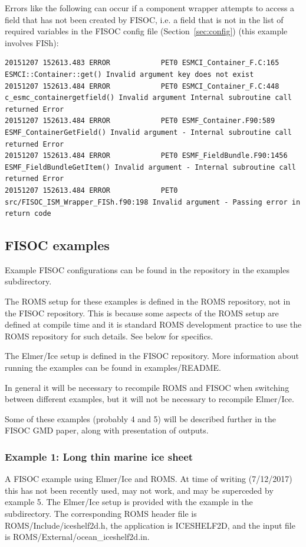 \documentclass[12pt]{article}
\begin{document}
Errors like the following can occur if a component wrapper attempts to access a field 
that has not been created by FISOC, i.e. a field that is not in the list of
required variables in the FISOC config file (Section~\ref{sec:config}) 
(this example involves FISh):
\begin{lstlisting}
20151207 152613.483 ERROR            PET0 ESMCI_Container_F.C:165 ESMCI::Container::get() Invalid argument key does not exist
20151207 152613.484 ERROR            PET0 ESMCI_Container_F.C:448 c_esmc_containergetfield() Invalid argument Internal subroutine call returned Error
20151207 152613.484 ERROR            PET0 ESMF_Container.F90:589 ESMF_ContainerGetField() Invalid argument - Internal subroutine call returned Error
20151207 152613.484 ERROR            PET0 ESMF_FieldBundle.F90:1456 ESMF_FieldBundleGetItem() Invalid argument - Internal subroutine call returned Error
20151207 152613.484 ERROR            PET0 src/FISOC_ISM_Wrapper_FISh.f90:198 Invalid argument - Passing error in return code
\end{lstlisting}





\subsection{FISOC examples}

Example FISOC configurations can be found in the repository in the 
examples subdirectory. 

The ROMS setup for these examples is defined in the ROMS repository, not in the 
FISOC repository.  This is because some aspects of the ROMS setup are defined at 
compile time and it is standard ROMS development practice to use the ROMS 
repository for such details.  See below for specifics. 

The Elmer/Ice setup is defined in the FISOC 
repository.  
More information about running the examples can be found in 
examples/README.

In general it will be necessary to recompile ROMS and FISOC 
when switching between different examples, but it will not be necessary 
to recompile Elmer/Ice.

Some of these examples (probably 4 and 5) will be 
described further in the FISOC GMD paper, 
along with presentation of outputs.



\subsubsection{Example 1: Long thin marine ice sheet}
A FISOC example using Elmer/Ice and ROMS. 
At time of writing (7/12/2017) this has not been 
recently used, may not work, and may be superceded by 
example 5. 
The Elmer/Ice setup is provided with the example in the subdirectory. 
The corresponding ROMS header file is ROMS/Include/iceshelf2d.h, 
the application is ICESHELF2D, and 
the input file is ROMS/External/ocean\_iceshelf2d.in.
\end{document}
